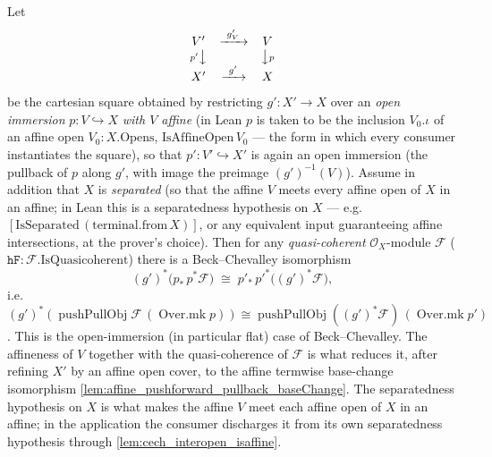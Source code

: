 \begin{lemma}\leanok
  \label{lem:openimm_beckchevalley}
  Let
  \[
    \begin{array}{ccc}
      V' & \xrightarrow{\ g'_V\ } & V\\
      {\scriptstyle p'}\big\downarrow & & \big\downarrow{\scriptstyle p}\\
      X' & \xrightarrow{\ g'\ } & X
    \end{array}
  \]
  be the cartesian square obtained by restricting \(g' : X' \to X\) over an \emph{open
  immersion} \(p : V \hookrightarrow X\) \emph{with \(V\) affine} (in Lean \(p\) is taken to be
  the inclusion \(V_0.\iota\) of an affine open \(V_0 : X.\mathrm{Opens}\),
  \(\mathrm{IsAffineOpen}\,V_0\) --- the form in which every consumer instantiates the square),
  so that \(p' : V' \hookrightarrow X'\) is again an open immersion (the pullback of \(p\) along
  \(g'\), with image the preimage \((g')^{-1}(V)\)). Assume in addition that \(X\) is
  \emph{separated} (so that the affine \(V\) meets every affine open of \(X\) in an affine;
  in Lean this is a separatedness hypothesis on \(X\) --- e.g.\ \([\mathrm{IsSeparated}\,
  (\mathrm{terminal.from}\,X)]\), or any equivalent input guaranteeing affine
  intersections, at the prover's choice). Then for any \emph{quasi-coherent}
  \(\mathcal{O}_X\)-module \(\mathcal{F}\) (\(\mathtt{hF} : \mathcal{F}.\mathrm{IsQuasicoherent}\))
  there is a Beck--Chevalley isomorphism
  \[
    (g')^*\bigl(p_*\,p^*\mathcal{F}\bigr)
      \;\cong\;
    p'_*\,p'^*\bigl((g')^*\mathcal{F}\bigr),
  \]
  i.e.\ \((g')^*(\operatorname{pushPullObj}\mathcal{F}\,(\operatorname{Over.mk} p)) \cong
  \operatorname{pushPullObj}((g')^*\mathcal{F})\,(\operatorname{Over.mk} p')\). This is the
  open-immersion (in particular flat) case of Beck--Chevalley. The affineness of \(V\)
  together with the quasi-coherence of \(\mathcal{F}\) is what reduces it, after refining
  \(X'\) by an affine open cover, to the affine termwise base-change isomorphism
  \cref{lem:affine_pushforward_pullback_baseChange}. The separatedness hypothesis on \(X\) is
  what makes the affine \(V\) meet each affine open of \(X\) in an affine; in the application
  the consumer discharges it from its own separatedness hypothesis through
  \cref{lem:cech_interopen_isaffine}.
\end{lemma}

